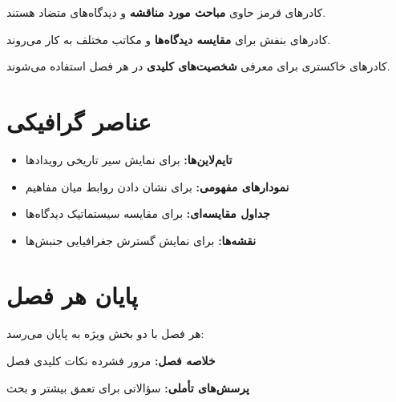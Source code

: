 \vspace{10pt}

\begin{debatebox}
کادرهای قرمز حاوی \textbf{مباحث مورد مناقشه} و دیدگاه‌های متضاد هستند.
\end{debatebox}

\vspace{10pt}

\begin{comparebox}[مقایسه]
کادرهای بنفش برای \textbf{مقایسه دیدگاه‌ها} و مکاتب مختلف به کار می‌روند.
\end{comparebox}

\vspace{10pt}

\begin{personbox}[شخصیت]
کادرهای خاکستری برای معرفی \textbf{شخصیت‌های کلیدی} در هر فصل استفاده می‌شوند.
\end{personbox}

\section*{عناصر گرافیکی}

\begin{itemize}[nosep, rightmargin=1.5cm]
    \item \textbf{تایم‌لاین‌ها:} برای نمایش سیر تاریخی رویدادها
    \item \textbf{نمودارهای مفهومی:} برای نشان دادن روابط میان مفاهیم
    \item \textbf{جداول مقایسه‌ای:} برای مقایسه سیستماتیک دیدگاه‌ها
    \item \textbf{نقشه‌ها:} برای نمایش گسترش جغرافیایی جنبش‌ها
\end{itemize}

\section*{پایان هر فصل}

هر فصل با دو بخش ویژه به پایان می‌رسد:

\begin{summarybox}
\textbf{خلاصه فصل:} مرور فشرده نکات کلیدی فصل
\end{summarybox}

\vspace{10pt}

\begin{questionbox}
\textbf{پرسش‌های تأملی:} سؤالاتی برای تعمق بیشتر و بحث
\end{questionbox}

